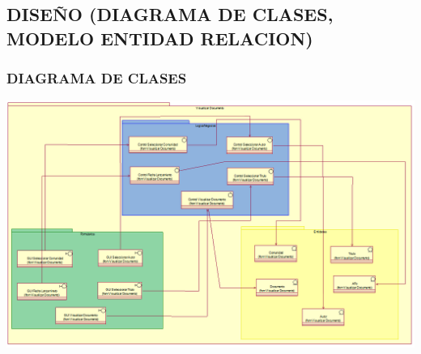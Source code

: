 \subsection{DISEÑO (DIAGRAMA DE CLASES, MODELO ENTIDAD RELACION)}
\subsubsection{DIAGRAMA DE CLASES}
\begin{center}
\includegraphics[width=18cm]{./Imagenes/diagramaclases}
\end{center}